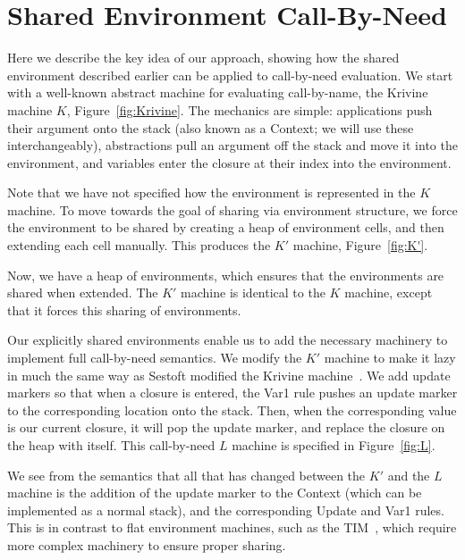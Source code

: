 \documentclass[preprint]{sigplanconf}
\begin{document}
\section{Shared Environment Call-By-Need} \label{sec:calc}

Here we describe the key idea of our approach, showing how
the shared environment described earlier can be applied to call-by-need
evaluation. We start with a well-known abstract machine for evaluating
call-by-name, the Krivine machine $K$, Figure~\ref{fig:Krivine}.
The mechanics are simple: applications push their argument onto the stack (also
known as a Context; we will use these interchangeably), abstractions pull
an argument off the stack and move it into the environment, and variables enter
the closure at their index into the environment.



Note that we have not specified how the environment is represented in the $K$
machine. To move towards the goal of sharing via environment structure,
we force the environment to be shared by creating a heap of environment
cells, and then extending each cell manually. This produces the $K'$ machine,
Figure~\ref{fig:K'}.



Now, we have a heap of environments, which ensures that the
environments are shared when extended.  The $K'$ machine is identical to the $K$
machine, except that it forces this sharing of environments. 

Our explicitly shared environments enable us to add the necessary
machinery to implement full call-by-need semantics. We modify the $K'$ machine
to make it lazy in much the same way as Sestoft modified the Krivine
machine~\cite{sestoft}. We add update markers so that when a closure is entered,
the Var1 rule pushes an update marker to the corresponding location onto the
stack.  Then, when the corresponding value is our current closure, it will pop
the update marker, and replace the closure on the heap with itself. This
call-by-need $L$ machine is specified in Figure~\ref{fig:L}.



We see from the semantics that all that has changed between the $K'$ and the
$L$ machine is the addition of the update marker to the Context
(which can be implemented as a normal stack), and the corresponding Update and
Var1 rules. This is in contrast to flat environment machines, such as the
TIM~\cite{TIM}, which require more complex machinery to ensure proper sharing.
\end{document}
